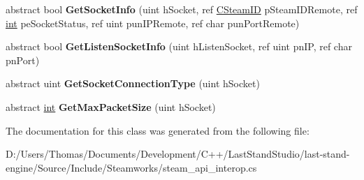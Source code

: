 \begin{DoxyCompactItemize}
\item 
\hypertarget{classValve_1_1Steamworks_1_1ISteamNetworking_af80f899fa36d4d26e4e24e0dc4e724a4}{}abstract bool {\bfseries Get\+Socket\+Info} (uint h\+Socket, ref \hyperlink{structValve_1_1Steamworks_1_1CSteamID}{C\+Steam\+I\+D} p\+Steam\+I\+D\+Remote, ref \hyperlink{SDL__thread_8h_a6a64f9be4433e4de6e2f2f548cf3c08e}{int} pe\+Socket\+Status, ref uint pun\+I\+P\+Remote, ref char pun\+Port\+Remote)\label{classValve_1_1Steamworks_1_1ISteamNetworking_af80f899fa36d4d26e4e24e0dc4e724a4}

\item 
\hypertarget{classValve_1_1Steamworks_1_1ISteamNetworking_a5408b0cd6273dfc1fcee5b41d948b0db}{}abstract bool {\bfseries Get\+Listen\+Socket\+Info} (uint h\+Listen\+Socket, ref uint pn\+I\+P, ref char pn\+Port)\label{classValve_1_1Steamworks_1_1ISteamNetworking_a5408b0cd6273dfc1fcee5b41d948b0db}

\item 
\hypertarget{classValve_1_1Steamworks_1_1ISteamNetworking_a2cbc391ec97ebae45b154fa601402fcc}{}abstract uint {\bfseries Get\+Socket\+Connection\+Type} (uint h\+Socket)\label{classValve_1_1Steamworks_1_1ISteamNetworking_a2cbc391ec97ebae45b154fa601402fcc}

\item 
\hypertarget{classValve_1_1Steamworks_1_1ISteamNetworking_aaac1d1d16b568da50ecc71de2c2e5afb}{}abstract \hyperlink{SDL__thread_8h_a6a64f9be4433e4de6e2f2f548cf3c08e}{int} {\bfseries Get\+Max\+Packet\+Size} (uint h\+Socket)\label{classValve_1_1Steamworks_1_1ISteamNetworking_aaac1d1d16b568da50ecc71de2c2e5afb}

\end{DoxyCompactItemize}


The documentation for this class was generated from the following file\+:\begin{DoxyCompactItemize}
\item 
D\+:/\+Users/\+Thomas/\+Documents/\+Development/\+C++/\+Last\+Stand\+Studio/last-\/stand-\/engine/\+Source/\+Include/\+Steamworks/steam\+\_\+api\+\_\+interop.\+cs\end{DoxyCompactItemize}
